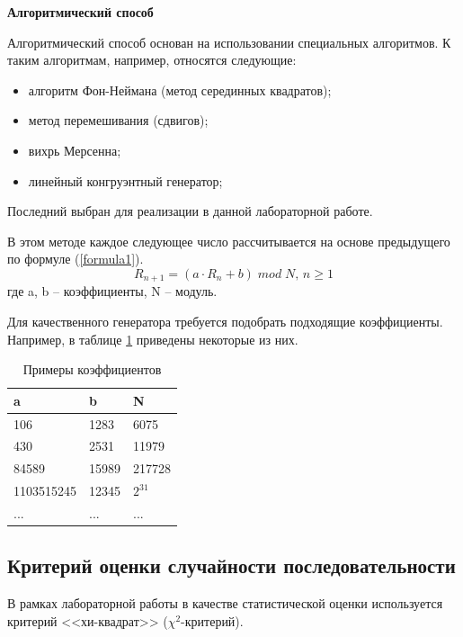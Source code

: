 \documentclass[14pt, a4paper]{extarticle}
\begin{document}
\textbf{Алгоритмический способ}

Алгоритмический способ основан на использовании специальных алгоритмов. К таким алгоритмам, например, относятся следующие:

\begin{itemize}
	\item алгоритм Фон-Неймана (метод серединных квадратов);
	\item метод перемешивания (сдвигов);
	\item вихрь Мерсенна;
	\item линейный конгруэнтный генератор;
\end{itemize}

Последний выбран для реализации в данной лабораторной работе. 

В этом методе каждое следующее число рассчитывается на основе предыдущего по формуле (\ref{formula1}).
\begin{equation}\label{formula1}
	R_{n + 1} = (a \cdot R_n + b)\;mod\;N,\, n \geq 1
\end{equation}
где a, b -- коэффициенты, N -- модуль.

Для качественного генератора требуется подобрать подходящие коэффициенты. Например, в таблице \ref{k} приведены некоторые из них.
\begin{table}[h]
	\begin{center}
		\caption{Примеры коэффициентов}
		\label{k}
		\begin{tabular}{| p{3cm} | p{3cm} | p{3cm}|}
			\hline
			\textbf{a} 			& \textbf{b} 	& \textbf{N} \\
			\hline
			106 				& 1283 			& 6075 \\ 
			\hline
			430 				& 2531  		& 11979 \\ 
			\hline
			84589 				& 15989 		& 217728 \\ 
			\hline
			1103515245 			& 12345 		& $2^{31}$ \\ 
			\hline
			... 				& ... 			& ... \\ 
			\hline
		\end{tabular}
	\end{center}
\end{table} 



\subsection{Критерий оценки случайности последовательности}

В рамках лабораторной работы в качестве статистической оценки используется критерий <<хи-квадрат>> ($\chi^2$-критерий).
\end{document}

